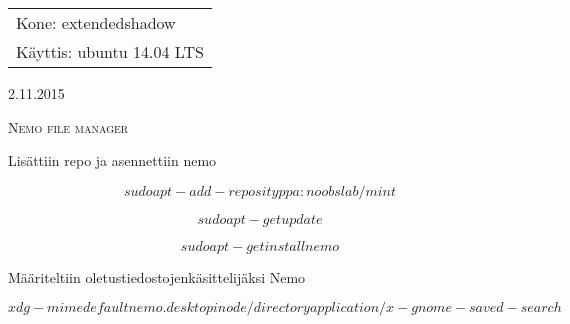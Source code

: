 \documentclass[main.tex]{subfiles}
\begin{document}
\thispagestyle{empty}
\begin{tabular}[t]{l}
Kone: extendedshadow\\
Käyttis: ubuntu 14.04 LTS
\end{tabular}
\hfill 2.11.2015

{\scshape\Large{Nemo file manager}}

Lisättiin repo ja asennettiin nemo

\[
sudo apt-add-reposity ppa:noobslab/mint
\]

\[
sudo apt-get update
\]

\[
sudo apt-get install nemo
\]

Määriteltiin oletustiedostojenkäsittelijäksi Nemo

\[
xdg-mime default nemo.desktop inode/directory application/x-gnome-saved-search
\]
\end{document}
